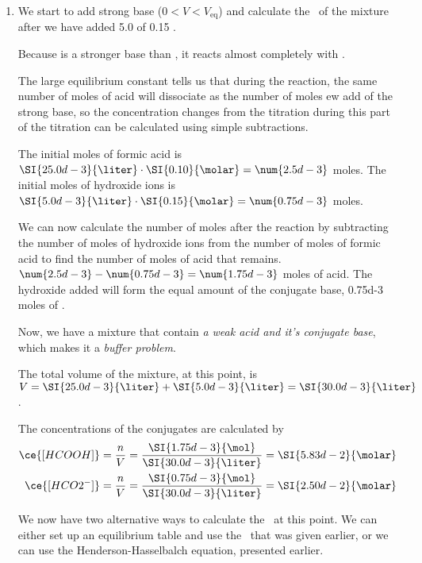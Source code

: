 \documentclass[../mit-general-chemistry.tex]{subfiles}
\begin{document}
\begin{example}
\begin{enumerate}[label=\arabic*)]
  \item We start to add strong base ($0 < V < V_{\text{eq}}$) and
    calculate the \pH\ of the mixture after we have added
    \SI{5.0}{\milliliter} of \SI{0.15}{\molar} .

    \paragraphbreak

    Because \hydroxide is a stronger base than , it reacts
    almost completely with .


    The large equilibrium constant tells us that during the reaction,
    the same number of moles of acid will dissociate as the number of
    moles ew add of the strong base, so the concentration changes from
    the titration during this part of the titration can be calculated
    using simple subtractions.

    The initial moles of formic acid is $\SI{25.0d-3}{\liter} \cdot
    \SI{0.10}{\molar} = \num{2.5d-3}$ moles. The initial moles of
    hydroxide ions is $\SI{5.0d-3}{\liter} \cdot \SI{0.15}{\molar} =
    \num{0.75d-3}$ moles.
    
    We can now calculate the number of moles after the reaction by
    subtracting the number of moles of hydroxide ions from the number
    of moles of formic acid to find the number of moles of acid that
    remains. $\num{2.5d-3} - \num{0.75d-3} = \num{1.75d-3}$ moles of
    acid. The hydroxide added will form the equal amount of the
    conjugate base, \num{0.75d-3} moles of .

    Now, we have a mixture that contain {\em a weak acid and it's
      conjugate base}, which makes it a {\em buffer problem}.

    The total volume of the mixture, at this point, is
    $V = \SI{25.0d-3}{\liter} + \SI{5.0d-3}{\liter} =
    \SI{30.0d-3}{\liter}$.

    The concentrations of the conjugates are calculated by
    \begin{align*}
      \ce{[HCOOH]} = \frac{n}{V}
      &= \frac{\SI{1.75d-3}{\mol}}{\SI{30.0d-3}{\liter}}
      = \SI{5.83d-2}{\molar} \\
      \ce{[HCO2^-]} = \frac{n}{V}
      &= \frac{\SI{0.75d-3}{\mol}}{\SI{30.0d-3}{\liter}}
      = \SI{2.50d-2}{\molar} \\
    \end{align*}

    We now have two alternative ways to calculate the \pH\ at this
    point. We can either set up an equilibrium table and use the
    \Ka\ that was given earlier, or we can use the
    Henderson-Hasselbalch equation, presented earlier.


\end{enumerate}
\end{example}
\end{document}
